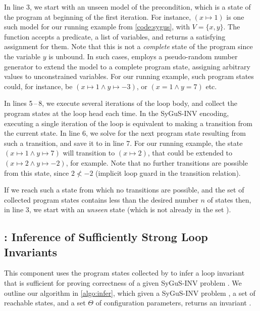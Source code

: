\documentclass[conference]{IEEEtran}
\begin{document}
In line 3, we start with an unseen model of the precondition,
which is a state of the program at beginning of the first iteration.
For instance, $(x \mapsto 1)$ is one such model for our running example from \cref{code:sygus}, with $V = \{x, y\}$.
The \GetModel function accepts a predicate, a list of variables,
and returns a satisfying assignment for them.
Note that this is not a \emph{complete} state of the program since the variable $y$ is unbound.
In such cases, \GetModel employs a pseudo-random number generator to extend the model to a complete program state,
assigning arbitrary values to unconstrained variables.
For our running example, such program states could, for instance,
be $(x \mapsto 1 \wedge y \mapsto -3)$, or $(x = 1 \wedge y = 7)$ etc.

In lines 5\,--\,8, we execute several iterations of the loop body, and collect the program states at the loop head each time.
In the SyGuS-INV encoding, executing a single iteration of the loop is equivalent to making a transition from the current state.
In line 6, we solve for the next program state resulting from such a transition, and save it to \States in line 7.
For our running example, the state $(x \mapsto 1 \wedge y \mapsto 7)$ will transition to $(x \mapsto 2)$,
that could be extended to $(x \mapsto 2 \wedge y \mapsto -2)$, for example.
Note that no further transitions are possible from this state,
since $2 \not< -2$ (implicit loop guard in the transition relation).

If we reach such a state from which no transitions are possible,
and the set \States of collected program states contains less than the desired number $n$ of states then, in line 3,
we start with an \emph{unseen} state (which is not already in the set \States).




\subsection{\Infer: Inference of Sufficiently Strong Loop Invariants} \label{subsec:Infer}

\noindent
This component uses the program states collected by \Record to infer a loop invariant that is sufficient
for proving correctness of a given SyGuS-INV problem \SyGuSINVQuadruplet.
We outline our \Infer algorithm in \cref{algo:infer}, which given a SyGuS-INV problem \SyGuSINVQuadruplet,
a set \States of reachable states, and a set $\Theta$ of configuration parameters,
returns an invariant \Inv.
\end{document}
